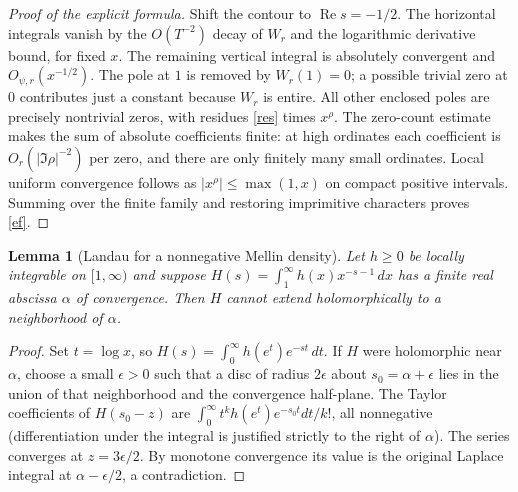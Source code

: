 \documentclass[11pt]{article}
\newtheorem{lemma}[theorem]{Lemma}
\theoremstyle{remark}\newtheorem{remark}[theorem]{Remark}
\newcommand{\Rea}{\operatorname{Re}}
\begin{document}
\begin{proof}[Proof of the explicit formula]
Shift the contour to $\Rea s=-1/2$. The horizontal integrals vanish by the $O(T^{-2})$ decay of $W_r$ and the logarithmic derivative bound, for fixed $x$. The remaining vertical integral is absolutely convergent and $O_{\psi,r}(x^{-1/2})$. The pole at $1$ is removed by $W_r(1)=0$; a possible trivial zero at $0$ contributes just a constant because $W_r$ is entire. All other enclosed poles are precisely nontrivial zeros, with residues \eqref{res} times $x^\rho$. The zero-count estimate makes the sum of absolute coefficients finite: at high ordinates each coefficient is $O_r(|\Im\rho|^{-2})$ per zero, and there are only finitely many small ordinates. Local uniform convergence follows as $|x^\rho|\le\max(1,x)$ on compact positive intervals. Summing over the finite family and restoring imprimitive characters proves \eqref{ef}.
\end{proof}

\begin{lemma}[Landau for a nonnegative Mellin density]\label{landau}
Let $h\ge0$ be locally integrable on $[1,\infty)$ and suppose $H(s)=\int_1^\infty h(x)x^{-s-1}\,dx$ has a finite real abscissa $\alpha$ of convergence. Then $H$ cannot extend holomorphically to a neighborhood of $\alpha$.
\end{lemma}
\begin{proof}
Set $t=\log x$, so $H(s)=\int_0^\infty h(e^t)e^{-st}\,dt$. If $H$ were holomorphic near $\alpha$, choose a small $\epsilon>0$ such that a disc of radius $2\epsilon$ about $s_0=\alpha+\epsilon$ lies in the union of that neighborhood and the convergence half-plane. The Taylor coefficients of $H(s_0-z)$ are $\int_0^\infty t^k h(e^t)e^{-s_0t}dt/k!$, all nonnegative (differentiation under the integral is justified strictly to the right of $\alpha$). The series converges at $z=3\epsilon/2$. By monotone convergence its value is the original Laplace integral at $\alpha-\epsilon/2$, a contradiction.
\end{proof}
\end{document}
